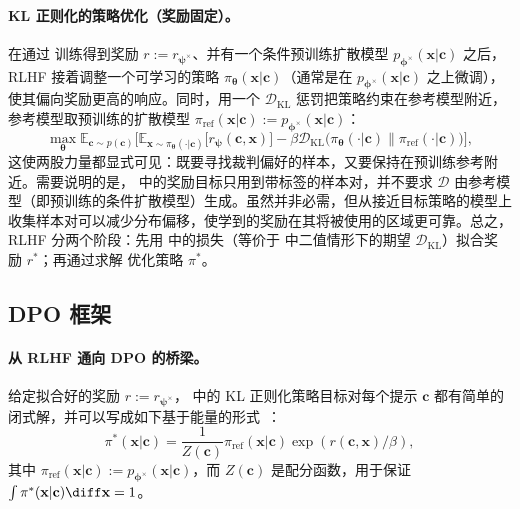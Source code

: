 \paragraph{KL 正则化的策略优化（奖励固定）。}
在通过  训练得到奖励 $r:=r_{\bm\psi^\times}$、并有一个条件预训练扩散模型 $p_{\bm{\phi}^\times}(\mathbf x|\mathbf c)$ 之后，RLHF 接着调整一个可学习的策略 $\pi_{\bm\theta}(\mathbf x|\mathbf c)$（通常是在 $p_{\bm{\phi}^\times}(\mathbf x|\mathbf c)$ 之上微调），使其偏向奖励更高的响应。同时，用一个 $\mathcal{D}_{\mathrm{KL}}$ 惩罚把策略约束在参考模型附近，参考模型取预训练的扩散模型 $\pi_{\mathrm{ref}}(\mathbf x|\mathbf c):=p_{\bm{\phi}^\times}(\mathbf x|\mathbf c)$：
\begin{equation}\label{eq:rlhf-policy-correct}
\max_{\bm\theta}
\mathbb E_{\mathbf c\sim p(\mathbf c)}
\Big[
\mathbb E_{\mathbf x\sim \pi_{\bm\theta}(\cdot|\mathbf c)}\big[r_{\bm\psi}(\mathbf c,\mathbf x)\big]
-\beta \mathcal{D}_{\mathrm{KL}} \big(\pi_{\bm\theta}(\cdot|\mathbf c) \big\| \pi_{\mathrm{ref}}(\cdot|\mathbf c)\big)
\Big],
\end{equation}
这使两股力量都显式可见：既要寻找裁判偏好的样本，又要保持在预训练参考附近。需要说明的是， 中的奖励目标只用到带标签的样本对，并不要求 $\mathcal D$ 由参考模型（即预训练的条件扩散模型）生成。虽然并非必需，但从接近目标策略的模型上收集样本对可以减少分布偏移，使学到的奖励在其将被使用的区域更可靠。总之，RLHF 分两个阶段：先用  中的损失（等价于  中二值情形下的期望 $\mathcal{D}_{\mathrm{KL}}$）拟合奖励 $r^*$；再通过求解  优化策略 $\pi^*$。


\subsection{DPO 框架}\label{subsec:dpo}
\paragraph{从 RLHF 通向 DPO 的桥梁。}
给定拟合好的奖励 $r := r_{\bm\psi^\times}$， 中的 KL 正则化策略目标对每个提示 $\mathbf c$ 都有简单的闭式解，并可以写成如下基于能量的形式~\citep{peters2010relative}：
\begin{equation}\label{eq:rlhf-closed-form}
\pi^*(\mathbf x|\mathbf c)
=
\frac{1}{Z(\mathbf c)} \pi_{\mathrm{ref}}(\mathbf x|\mathbf c)\exp(r(\mathbf c,\mathbf x)/\beta),
\end{equation}
其中 $\pi_{\mathrm{ref}}(\mathbf x|\mathbf c):=p_{\bm{\phi}^\times}(\mathbf x|\mathbf c)$，而 $Z(\mathbf c)$ 是配分函数，用于保证 $\int \pi^*(\mathbf x|\mathbf c) \diff \mathbf x=1$。

